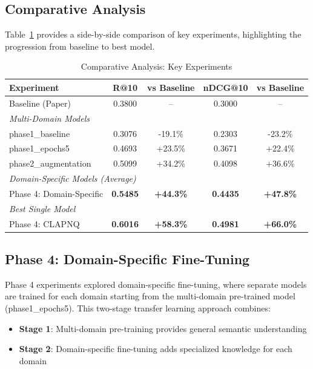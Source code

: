 \documentclass[conference]{IEEEtran}
\begin{document}
\subsection{Comparative Analysis}

Table~\ref{tab:comparison} provides a side-by-side comparison of key experiments, highlighting the progression from baseline to best model.

\begin{table}[htbp]
\centering
\caption{Comparative Analysis: Key Experiments}
\label{tab:comparison}
\footnotesize
\begin{tabular}{lcccc}
\toprule
\textbf{Experiment} & \textbf{R@10} & \textbf{vs Baseline} & \textbf{nDCG@10} & \textbf{vs Baseline} \\
\midrule
Baseline (Paper) & 0.3800 & -- & 0.3000 & -- \\
\midrule
\multicolumn{5}{l}{\textit{Multi-Domain Models}} \\
phase1\_baseline & 0.3076 & -19.1\% & 0.2303 & -23.2\% \\
phase1\_epochs5 & 0.4693 & +23.5\% & 0.3671 & +22.4\% \\
phase2\_augmentation & 0.5099 & +34.2\% & 0.4098 & +36.6\% \\
\midrule
\multicolumn{5}{l}{\textit{Domain-Specific Models (Average)}} \\
Phase 4: Domain-Specific & \textbf{0.5485} & \textbf{+44.3\%} & \textbf{0.4435} & \textbf{+47.8\%} \\
\midrule
\multicolumn{5}{l}{\textit{Best Single Model}} \\
Phase 4: CLAPNQ & \textbf{0.6016} & \textbf{+58.3\%} & \textbf{0.4981} & \textbf{+66.0\%} \\
\bottomrule
\end{tabular}
\end{table}

\subsection{Phase 4: Domain-Specific Fine-Tuning}

Phase 4 experiments explored domain-specific fine-tuning, where separate models are trained for each domain starting from the multi-domain pre-trained model (phase1\_epochs5). This two-stage transfer learning approach combines:
\begin{itemize}
    \item \textbf{Stage 1}: Multi-domain pre-training provides general semantic understanding
    \item \textbf{Stage 2}: Domain-specific fine-tuning adds specialized knowledge for each domain
\end{itemize}
\end{document}
